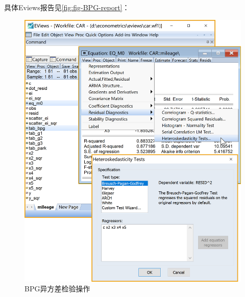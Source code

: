 \documentclass[12pt,(landscape,a4paper),(portrait,a4paper)]{article}
\begin{document}
具体Eviews报告见\ref{fig:fig-BPG-report}：

\begin{figure}

{\centering \includegraphics[width=24.11in]{picture/lab6-heteroskedasticity/4-test-BPG1} 

}

\caption{BPG异方差检验操作}\label{fig:fig-BPG-test}
\end{figure}
\end{document}

